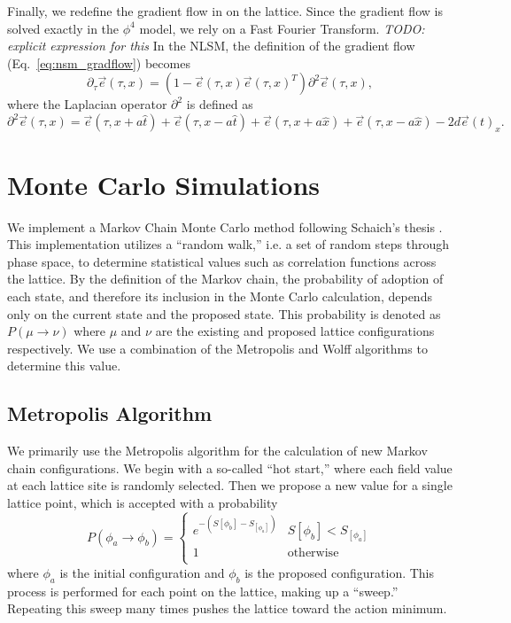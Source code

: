 \documentclass[12pt]{report}
\newcommand{\e}{\vec e}
\begin{document}
Finally, we redefine the gradient flow in on the lattice. Since the gradient flow is solved exactly in the $\phi^4$ model, we rely on a Fast Fourier Transform. \textit{TODO: explicit expression for this} In the NLSM, the definition of the gradient flow (Eq.~\ref{eq:nsm_gradflow}) becomes 
\begin{equation}
    \label{eq:nsm_gradflow_disc}
    \partial_\tau \e (\tau, x) = \left( 1 - \e(\tau,x) \e(\tau,x)^T\right) \partial^2 \e(\tau,x),
\end{equation}
 where the Laplacian operator $\partial^2$ is defined as
\begin{equation*}
    \partial^2 \e(\tau,x) = \e(\tau, x+a \hat{t}) + \e(\tau,x-a\hat t) + \e(\tau, x+a \hat{x}) + \e(\tau,x-a\hat x) - 2 d \e(t)_x.
\end{equation*}


\section{Monte Carlo Simulations}
\label{sec:mc}
We implement a Markov Chain Monte Carlo method following Schaich's thesis \cite{schaich2006}. This implementation utilizes a ``random walk,'' i.e. a set of random steps through phase space, to determine statistical values such as correlation functions across the lattice. By the definition of the Markov chain, the probability of adoption of each state, and therefore its inclusion in the Monte Carlo calculation, depends only on the current state and the proposed state. This probability is denoted as $P(\mu\rightarrow\nu)$ where $\mu$ and $\nu$ are the existing and proposed lattice configurations respectively. We use a combination of the Metropolis and Wolff algorithms to determine this value.

\subsection{Metropolis Algorithm}
We primarily use the Metropolis algorithm for the calculation of new Markov chain configurations. We begin with a so-called ``hot start,'' where each field value at each lattice site is randomly selected. Then we propose a new value for a single lattice point, which is accepted with a probability
\begin{equation}
    P(\phi_a\rightarrow\phi_b) = \begin{cases} 
        e^{-(S[\phi_b] - S_[\phi_a])} & S[\phi_b] < S_[\phi_a] \\
        1 & \mathrm{otherwise} \\
   \end{cases}
\end{equation}
where $\phi_a$ is the initial configuration and $\phi_b$ is the proposed configuration. This process is performed for each point on the lattice, making up a ``sweep.'' Repeating this sweep many times pushes the lattice toward the action minimum.
\end{document}
